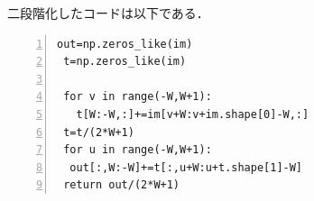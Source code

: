 \documentclass[autodetect-engine,dvi=dvipdfmx,ja=standard,
               a4j,11pt]{bxjsarticle}
\begin{document}
二段階化したコードは以下である．
\begin{Verbatim}[numbers=left, xleftmargin=10mm, numbersep=6pt,
                    fontsize=\small, baselinestretch=0.8]
 out=np.zeros_like(im)
 t=np.zeros_like(im)
 
 for v in range(-W,W+1):
   t[W:-W,:]+=im[v+W:v+im.shape[0]-W,:]
 t=t/(2*W+1)
 for u in range(-W,W+1):
  out[:,W:-W]+=t[:,u+W:u+t.shape[1]-W]
 return out/(2*W+1)
\end{Verbatim}











\end{document}
